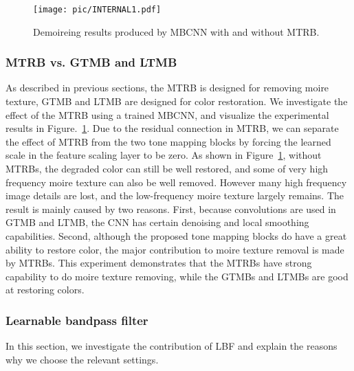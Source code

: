 \documentclass[10pt,twocolumn,letterpaper]{article}
\begin{document}
\begin{figure}[t]
  \centering
  \texttt{[image: pic/INTERNAL1.pdf]}
  \caption{Demoireing results produced by MBCNN with and without MTRB.}
  \label{MTRB-Comp}
\end{figure}

\subsubsection{MTRB vs. GTMB and LTMB}

As described in previous sections, the 
MTRB is designed for removing moire texture, GTMB and LTMB are designed for color restoration. 
We investigate the effect of the MTRB using a trained MBCNN, and visualize the experimental results in Figure.~\ref{MTRB-Comp}. 
Due to the residual connection in MTRB, we can separate the effect of MTRB from the two tone mapping blocks by forcing the learned scale in the feature scaling layer to be zero. 
As shown in Figure~\ref{MTRB-Comp}, without MTRBs, the degraded color can still be well restored, and some of very high frequency moire texture can also be well removed. 
However many high frequency image details are lost, and the low-frequency moire texture largely remains. 
The result is mainly caused by two reasons. 
First, because  convolutions are used in GTMB and LTMB, the CNN has certain denoising and local smoothing capabilities. 
Second, although the proposed tone mapping blocks do have a great ability to restore color, the major contribution to moire texture removal is made by MTRBs. 
This experiment demonstrates that the MTRBs have strong capability to do moire texture removing, while the GTMBs and LTMBs are good at restoring colors. 



\subsubsection{Learnable bandpass filter}
In this section, we investigate the contribution of LBF and explain the reasons why we choose the relevant settings. 
\end{document}
